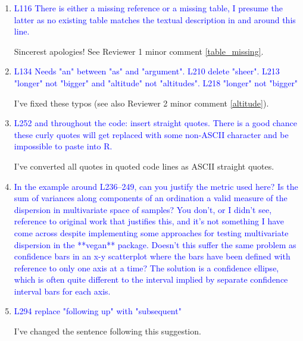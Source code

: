 \documentclass[12pt,letterpaper]{article}
\begin{document}
\begin{enumerate}

\item{\textcolor{blue}{L116 There is either a missing reference or a missing table, I presume the latter as no existing table matches the textual description in and around this line.}}

Sincerest apologies! See Reviewer 1 minor comment \ref{table_missing}.

\item{\textcolor{blue}{L134 Needs "an" between "as" and "argument". L210 delete "sheer". L213 "longer" not "bigger" and "altitude" not "altitudes". L218 "longer" not "bigger"}}

I've fixed these typos (see also Reviewer 2 minor comment \ref{altitude}).

\item{\textcolor{blue}{L252 and throughout the code: insert straight quotes. There is a good chance these curly quotes will get replaced with some non-ASCII character and be impossible to paste into R.}}

I've converted all quotes in quoted code lines as ASCII straight quotes.

\item{\textcolor{blue}{In the example around L236--249, can you justify the metric used here? Is the sum of variances along components of an ordination a valid measure of the dispersion in multivariate space of samples? You don't, or I didn't see, reference to original work that justifies this, and it's not something I have come across despite implementing some approaches for testing multivariate dispersion in the **vegan** package. Doesn't this suffer the same problem as confidence bars in an x-y scatterplot where the bars have been defined with reference to only one axis at a time? The solution is a confidence ellipse, which is often quite different to the interval implied by separate confidence interval bars for each axis.}}


\item{\textcolor{blue}{L294 replace "following up" with "subsequent"}}

I've changed the sentence following this suggestion.


\end{enumerate}
\end{document}
